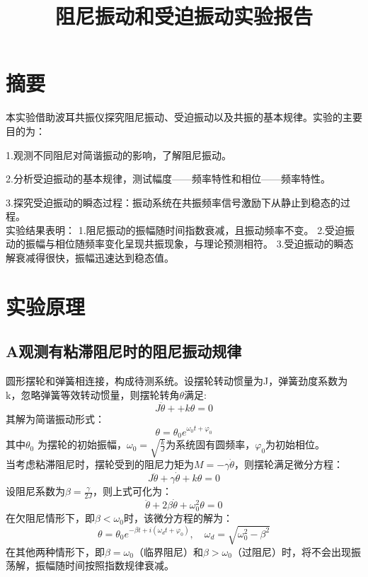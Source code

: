 \documentclass{ctexart}
\title{阻尼振动和受迫振动实验报告}
\begin{document}
\maketitle

\section*{摘要}
\noindent 本实验借助波耳共振仪探究阻尼振动、受迫振动以及共振的基本规律。实验的主要目的为：

1.观测不同阻尼对简谐振动的影响，了解阻尼振动。

2.分析受迫振动的基本规律，测试幅度——频率特性和相位——频率特性。

3.探究受迫振动的瞬态过程：振动系统在共振频率信号激励下从静止到稳态的过程。\\
\noindent 实验结果表明：
    1.阻尼振动的振幅随时间指数衰减，且振动频率不变。
    2.受迫振动的振幅与相位随频率变化呈现共振现象，与理论预测相符。
    3.受迫振动的瞬态解衰减得很快，振幅迅速达到稳态值。


\section{实验原理}
\subsection*{A\quad 观测有粘滞阻尼时的阻尼振动规律}
圆形摆轮和弹簧相连接，构成待测系统。设摆轮转动惯量为J，弹簧劲度系数为k，忽略弹簧等效转动惯量，则摆轮转角$\theta$满足:
\begin{equation}
  J\ddot{\theta} + + k\theta = 0
\end{equation}
其解为简谐振动形式：
\begin{equation}
  \theta = \theta_0 e^{\omega_0 t + \varphi_0}
\end{equation}
其中$\theta_0$ 为摆轮的初始振幅，$\omega_0 = \sqrt{\frac{k}{J}}$为系统固有圆频率，$\varphi_0$为初始相位。\\
当考虑粘滞阻尼时，摆轮受到的阻尼力矩为$M = -\gamma \dot{\theta}$，则摆轮满足微分方程：
\begin{equation}
  J\ddot{\theta} + \gamma \dot{\theta} + k\theta = 0
\end{equation}
设阻尼系数为$\beta = \frac{\gamma}{2J}$，则上式可化为：
\begin{equation}
  \ddot{\theta} + 2\beta \dot{\theta} + \omega_0^2\theta = 0
\end{equation}
在欠阻尼情形下，即$\beta < \omega_0$时，该微分方程的解为：
\begin{equation}
  \theta = \theta_0 e^{-\beta t+i(\omega_d t+\varphi_0)}, \quad \omega_d = \sqrt{\omega_0^2 - \beta^2}
\end{equation}
在其他两种情形下，即$\beta = \omega_0$（临界阻尼）和$\beta > \omega_0$（过阻尼）时，将不会出现振荡解，振幅随时间按照指数规律衰减。
\end{document}
